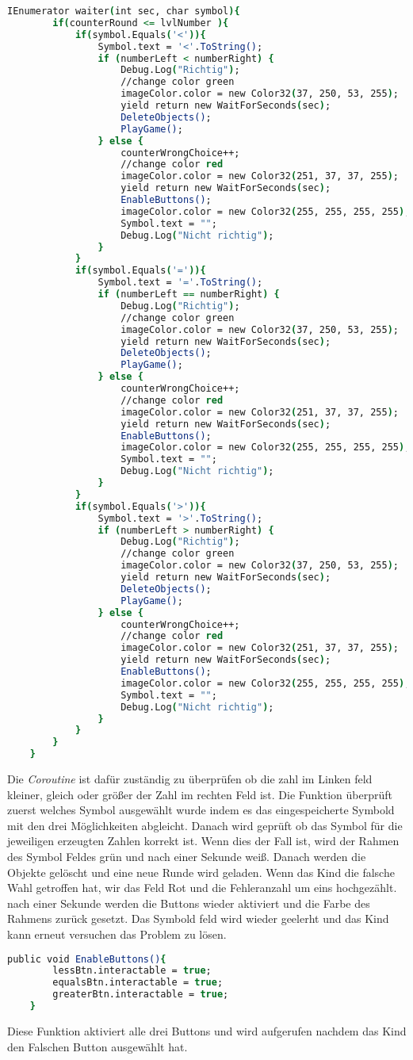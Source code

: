 \begin{lstlisting}[language=csh, caption={GameQuantities.cs waiter Funktion}]
IEnumerator waiter(int sec, char symbol){
		if(counterRound <= lvlNumber ){
			if(symbol.Equals('<')){
				Symbol.text = '<'.ToString();
				if (numberLeft < numberRight) {
					Debug.Log("Richtig");
					//change color green
					imageColor.color = new Color32(37, 250, 53, 255);
					yield return new WaitForSeconds(sec);
					DeleteObjects();
					PlayGame();
				} else {
					counterWrongChoice++;
					//change color red
					imageColor.color = new Color32(251, 37, 37, 255);
					yield return new WaitForSeconds(sec);
					EnableButtons();
					imageColor.color = new Color32(255, 255, 255, 255);
					Symbol.text = "";
					Debug.Log("Nicht richtig");
				}
			}
			if(symbol.Equals('=')){
				Symbol.text = '='.ToString();
				if (numberLeft == numberRight) {
					Debug.Log("Richtig");
					//change color green
					imageColor.color = new Color32(37, 250, 53, 255);
					yield return new WaitForSeconds(sec);
					DeleteObjects();
					PlayGame();
				} else {
					counterWrongChoice++;
					//change color red
					imageColor.color = new Color32(251, 37, 37, 255);
					yield return new WaitForSeconds(sec);
					EnableButtons();
					imageColor.color = new Color32(255, 255, 255, 255);
					Symbol.text = "";
					Debug.Log("Nicht richtig");
				}
			}
			if(symbol.Equals('>')){
				Symbol.text = '>'.ToString();
				if (numberLeft > numberRight) {
					Debug.Log("Richtig");
					//change color green
					imageColor.color = new Color32(37, 250, 53, 255);
					yield return new WaitForSeconds(sec);
					DeleteObjects();
					PlayGame();
				} else {
					counterWrongChoice++;
					//change color red
					imageColor.color = new Color32(251, 37, 37, 255);
					yield return new WaitForSeconds(sec);
					EnableButtons();
					imageColor.color = new Color32(255, 255, 255, 255);
					Symbol.text = "";
					Debug.Log("Nicht richtig");
				}
			}
		}
	}
\end{lstlisting}
Die \textit{Coroutine} ist dafür zuständig zu überprüfen ob die zahl im Linken feld kleiner, gleich oder größer der Zahl im rechten Feld ist. Die Funktion überprüft zuerst welches Symbol ausgewählt wurde indem es das eingespeicherte Symbold mit den drei Möglichkeiten abgleicht. Danach wird geprüft ob das Symbol für die jeweiligen erzeugten Zahlen korrekt ist. Wenn dies der Fall ist, wird der Rahmen des Symbol Feldes grün und nach einer Sekunde weiß. Danach werden die Objekte gelöscht und eine neue Runde wird geladen. Wenn das Kind die falsche Wahl getroffen hat, wir das Feld Rot und die Fehleranzahl um eins hochgezählt. nach einer Sekunde werden die Buttons wieder aktiviert und die Farbe des Rahmens zurück gesetzt. Das Symbold feld wird wieder geelerht und das Kind kann erneut versuchen das Problem zu lösen.\\
\begin{lstlisting}[language=csh, caption={GameQuantities.cs EnableButtons Funktion}]
	public void EnableButtons(){
		lessBtn.interactable = true;
		equalsBtn.interactable = true;
		greaterBtn.interactable = true;
	}
\end{lstlisting}
Diese Funktion aktiviert alle drei Buttons und wird aufgerufen nachdem das Kind den Falschen Button ausgewählt hat.

